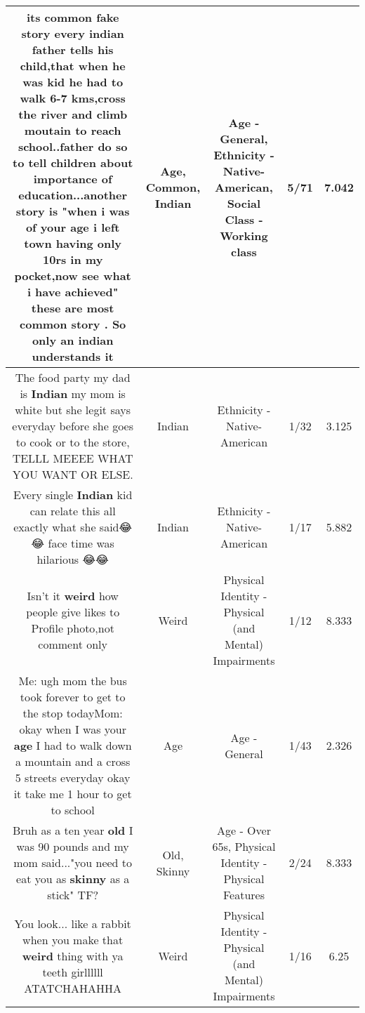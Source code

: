 \documentclass[11pt]{article}
\newlength\mylength
\begin{document}
\begin{center}
\begin{longtable}{|C{.65\mylength}|C{.30\mylength}|C{.12\mylength}|C{.12\mylength}|C{.12\mylength}|}
  \small its \textbf{common} fake story every \textbf{indian} father tells his child,that when he was kid he had to walk 6-7 kms,cross the river and climb moutain to reach school..father do so to tell children about importance of education...another story is "when i was of your \textbf{age} i left town having only 10rs in my pocket,now see what i have achieved" these are most \textbf{common} story . So only an \textbf{indian} understands it\normalsize   & Age, Common, Indian & Age - General, Ethnicity - Native-American, Social Class - Working class & 5/71 & 7.042 \\  \hline
  \small The food party my dad is \textbf{Indian} my mom is white but she legit says everyday before she goes to cook or to the store, TELLL MEEEE WHAT YOU WANT OR ELSE.\normalsize   & Indian & Ethnicity - Native-American & 1/32 & 3.125 \\  \hline
  \small Every single \textbf{Indian} kid can relate this all exactly what she said😂😂 face time was hilarious 😂😂\normalsize   & Indian & Ethnicity - Native-American & 1/17 & 5.882 \\  \hline
  \small Isn't it \textbf{weird} how people give likes to Profile photo,not comment only\normalsize   & Weird & Physical Identity - Physical (and Mental) Impairments & 1/12 & 8.333 \\  \hline
  \small Me: ugh mom the bus took forever to get to the stop todayMom: okay when I was your \textbf{age} I had to walk down a mountain and a cross 5 streets everyday okay it take me 1 hour to get to school\normalsize   & Age & Age - General & 1/43 & 2.326 \\  \hline
  \small Bruh as a ten year \textbf{old} I was 90 pounds and my mom said..."you need to eat you as \textbf{skinny} as a stick" TF?\normalsize   & Old, Skinny & Age - Over 65s, Physical Identity - Physical Features & 2/24 & 8.333 \\  \hline
  \small You look... like a rabbit when you make that \textbf{weird} thing with ya teeth girllllll ATATCHAHAHHA\normalsize   & Weird & Physical Identity - Physical (and Mental) Impairments & 1/16 & 6.25 \\  \hline

\end{longtable}
\end{center}
\end{document}
